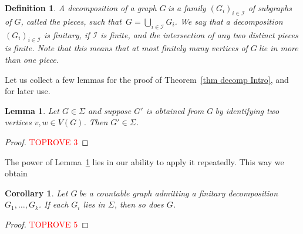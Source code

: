 \documentclass{article}
\newcommand{\Sig}{\ensuremath{\Sigma}}
\newcommand{\comment}[1]{}
\newcommand{\defi}[1]{{\color{darkgray}\emph{#1}}}
\newtheorem{definition}[proposition]{Definition}
\newtheorem{corollary}[proposition]{Corollary}
\newtheorem{lemma}[proposition]{Lemma}
\newcommand{\ci}{\ensuremath{\mathcal I}}
\newcommand{\sm}{\backslash}
\newcommand{\g}{\ensuremath{G\ }}
\newcommand{\G}{\ensuremath{G}}
\newcommand{\Lr}[1]{Lemma~\ref{#1}}
\newcommand{\Tr}[1]{Theorem~\ref{#1}}
\newcommand{\fe}{for every}
\newcommand{\st}{such that}
\begin{document}
\begin{definition} \label{def fin dec}
A \defi{decomposition} of a graph \g is a family $(G_i)_{i\in \ci}$ of subgraphs of \G, called the \defi{pieces}, \st\ $G= \bigcup_{i\in \ci} G_i$. We say that a decomposition $(G_i)_{i\in \ci}$ is \defi{finitary}, if $\ci$ is finite, and the intersection of any two distinct pieces is finite. Note that this means that at most finitely many vertices of \g lie in more than one piece.
\end{definition}

Let us collect a few lemmas for the proof of \Tr{thm decomp Intro}, and for later use. 

\begin{lemma} \label{lem S}
Let  $G \in \Sig$ and suppose $G'$ is obtained from \g by identifying two vertices $v,w\in V(G)$. Then $G' \in \Sig$.
\end{lemma}
\begin{proof}\textcolor{red}{TOPROVE 3}\end{proof}

\comment{
	To prove this we need to start with a nice enough embedding of $G$, which we now introduce.

Let $g:G \to \Gamma$ be an embedding of a countable graph \g into a compact surface. It was proved in \cite[Proposition 4.3.]{Universal} that we may assume $g$ to be \defi{generous} in the following sense. We say that $g$ is \defi{generous around vertices}, if \fe\ $v\in V(G)$ there is a topological open disc $D_v \subset \Gamma$ \st\ $D_v \cap g(V(G)) =g(v)$ and $D_v$ avoids $g(uw)$ for every edge $uw$ with $u,w\neq v$. Similarly, we say that $g$ is \defi{generous around edges}, if \fe\ $e=uv\in E(G)$ there is a topological open disc $D_e \subset \Gamma$ \st\ $D_e \cap g(G) = g(e) \sm \{g(u),g(v)\}$. We call $g$ \defi{generous} if it is generous  both around vertices and around edges. 


\begin{proof}\textcolor{red}{TOPROVE 4}\end{proof}
}

The power of \Lr{lem S} lies in our ability to apply it repeatedly. This way we obtain
\begin{corollary} \label{cor S plus}
Let \g be a countable graph admitting a finitary decomposition $G_1,\ldots, G_k$. If each $G_i$ lies in \Sig, then so does \G. \end{corollary}
\begin{proof}\textcolor{red}{TOPROVE 5}\end{proof}
\end{document}
